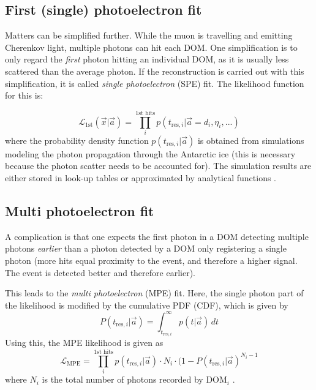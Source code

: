 \subsection{First (single) photoelectron fit}
Matters can be simplified further. While the muon is travelling and emitting Cherenkov light, multiple photons can hit each DOM. One simplification is to only regard the \textit{first} photon hitting an individual DOM, as it is usually less scattered than the average photon. If the reconstruction is carried out with this simplification, it is called \textit{single photoelectron} (SPE) fit. The likelihood function for this is:

\begin{equation}
\mathcal{L}_\text{1st}(\vec{x}|\vec{a}) = \prod_i^\text{1st hits} p(t_{\text{res},i}|\vec{a}=d_i, \eta_i,...)
\end{equation}
where the probability density function $p(t_{\text{res},i}|\vec{a})$ is obtained from simulations modeling the photon propagation through the Antarctic ice (this is necessary because the photon scatter needs to be accounted for). The simulation results are either stored in look-up tables or approximated by analytical functions \cite{Ahrens2004}. 

\subsection{Multi photoelectron fit}
A complication is that one expects the first photon in a DOM detecting multiple photons \textit{earlier} than a photon detected by a DOM only registering a single photon (more hits equal proximity to the event, and therefore a higher signal. The event is detected better and therefore earlier). 

This leads to the \textit{multi photoelectron} (MPE) fit. Here, the single photon part of the likelihood is modified by the cumulative PDF (CDF), which is given by
\begin{equation}
P(t_{\text{res},i}|\vec{a}) = \int^{\infty}_{t_{\text{res},i}}p(t|\vec{a})\,dt
\end{equation}
Using this, the MPE likelihood is given as
\begin{equation}
\mathcal{L}_\text{MPE} = \prod_i^\text{1st hits} p(t_{\text{res},i}|\vec{a}) \cdot N_i \cdot (1-P(t_{\text{res},i}|\vec{a})^{N_i-1}
\end{equation}
where $N_i$ is the total number of photons recorded by $\text{DOM}_i$ \cite{Ahrens2004}.

